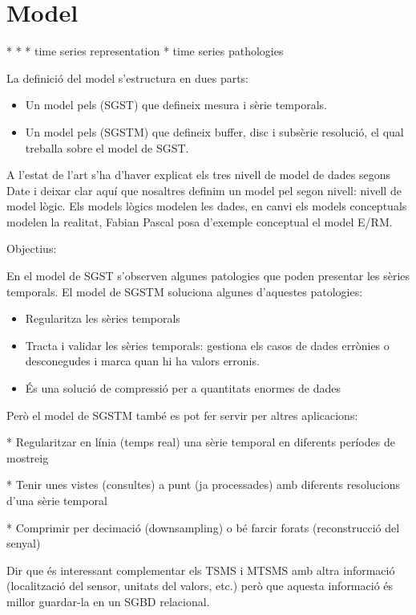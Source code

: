 
\section{Model}


* 
* 
* time series representation
* time series pathologies


La definició del model s'estructura en dues parts:

\begin{itemize}
\item Un model pels (SGST)  que defineix mesura i sèrie temporals.
\item Un model pels (SGSTM) que defineix buffer, disc i subsèrie
  resolució, el qual treballa sobre el model de SGST.
\end{itemize}

A l'estat de l'art s'ha d'haver explicat els tres nivell de model de dades segons Date i deixar clar aquí que nosaltres definim un model pel segon nivell: nivell de model lògic. Els models lògics modelen les dades, en canvi els models conceptuals modelen la realitat, Fabian Pascal posa d'exemple conceptual el model E/RM.


Objectius:

En el model de SGST s'observen algunes patologies que poden presentar les sèries temporals. El model de SGSTM soluciona algunes d'aquestes patologies:

\begin{itemize}
\item Regularitza les sèries temporals
\item Tracta i validar les sèries temporals: gestiona els casos de dades errònies o desconegudes i marca quan hi ha valors erronis.
\item És una solució de compressió per a quantitats enormes de dades
\end{itemize}


Però el model de SGSTM també es pot fer servir per altres aplicacions:

* Regularitzar en línia (temps real) una sèrie temporal en diferents períodes de mostreig

* Tenir unes vistes (consultes) a punt (ja processades) amb diferents resolucions d'una sèrie temporal

* Comprimir per decimació (downsampling) o bé farcir forats (reconstrucció del senyal)


Dir que és interessant complementar els TSMS i MTSMS amb altra informació (localització del sensor, unitats del valors, etc.) però que aquesta informació és millor guardar-la en un SGBD relacional.



